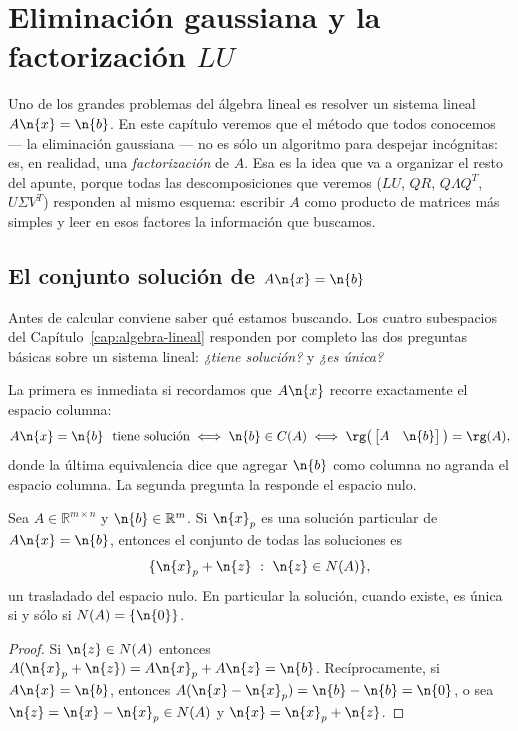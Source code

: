 
\chapter{Eliminación gaussiana y la factorización $LU$}\label{cap:LU}

Uno de los grandes problemas del álgebra lineal es resolver un sistema lineal
$A\n{x} = \n{b}$. En este capítulo veremos que el método que todos conocemos
--- la eliminación gaussiana --- no es sólo un algoritmo para despejar
incógnitas: es, en realidad, una \emph{factorización} de $A$. Esa es la idea que
va a organizar el resto del apunte, porque todas las descomposiciones que
veremos ($LU$, $QR$, $Q\Lambda Q^T$, $U\Sigma V^T$) responden al mismo esquema:
escribir $A$ como producto de matrices más simples y leer en esos factores la
información que buscamos.

\section{El conjunto solución de $A\n{x}=\n{b}$}
\label{sec:conjunto-solucion}

Antes de calcular conviene saber qué estamos buscando. Los cuatro subespacios
del Capítulo~\ref{cap:algebra-lineal} responden por completo las dos preguntas
básicas sobre un sistema lineal: \emph{¿tiene solución?} y \emph{¿es única?}

La primera es inmediata si recordamos que $A\n{x}$ recorre exactamente el
espacio columna:
\[
A\n{x}=\n{b} \ \text{ tiene solución}
\iff
\n{b}\in C(A)
\iff
\rg\big(\begin{bmatrix} A & \n{b}\end{bmatrix}\big) = \rg(A),
\]
donde la última equivalencia dice que agregar $\n{b}$ como columna no agranda el
espacio columna. La segunda pregunta la responde el espacio nulo.

\begin{theorem}\label{teo:conjunto-solucion}
Sea $A\in\mathbb{R}^{m\times n}$ y $\n{b}\in\mathbb{R}^m$. Si $\n{x}_p$ es una
solución particular de $A\n{x}=\n{b}$, entonces el conjunto de todas las
soluciones es
\[
\{\n{x}_p + \n{z} \ :\ \n{z}\in N(A)\},
\]
un trasladado del espacio nulo. En particular la solución, cuando existe, es
única si y sólo si $N(A)=\{\n{0}\}$.
\end{theorem}

\begin{proof}
Si $\n{z}\in N(A)$ entonces $A(\n{x}_p+\n{z}) = A\n{x}_p + A\n{z} = \n{b}$.
Recíprocamente, si $A\n{x} = \n{b}$, entonces
$A(\n{x}-\n{x}_p) = \n{b}-\n{b} = \n{0}$, o sea $\n{z}=\n{x}-\n{x}_p\in N(A)$ y
$\n{x} = \n{x}_p + \n{z}$.
\end{proof}

